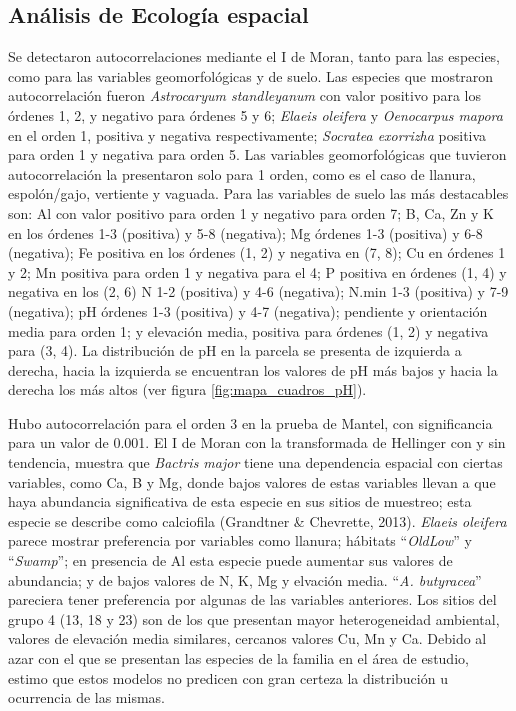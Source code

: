\documentclass[11pt,]{article}
\begin{document}
\subsection{Análisis de Ecología
espacial}\label{anuxe1lisis-de-ecologuxeda-espacial-1}

Se detectaron autocorrelaciones mediante el I de Moran, tanto para las
especies, como para las variables geomorfológicas y de suelo. Las
especies que mostraron autocorrelación fueron \emph{Astrocaryum
standleyanum} con valor positivo para los órdenes 1, 2, y negativo para
órdenes 5 y 6; \emph{Elaeis oleifera} y \emph{Oenocarpus mapora} en el
orden 1, positiva y negativa respectivamente; \emph{Socratea exorrizha}
positiva para orden 1 y negativa para orden 5. Las variables
geomorfológicas que tuvieron autocorrelación la presentaron solo para 1
orden, como es el caso de llanura, espolón/gajo, vertiente y vaguada.
Para las variables de suelo las más destacables son: Al con valor
positivo para orden 1 y negativo para orden 7; B, Ca, Zn y K en los
órdenes 1-3 (positiva) y 5-8 (negativa); Mg órdenes 1-3 (positiva) y 6-8
(negativa); Fe positiva en los órdenes (1, 2) y negativa en (7, 8); Cu
en órdenes 1 y 2; Mn positiva para orden 1 y negativa para el 4; P
positiva en órdenes (1, 4) y negativa en los (2, 6) N 1-2 (positiva) y
4-6 (negativa); N.min 1-3 (positiva) y 7-9 (negativa); pH órdenes 1-3
(positiva) y 4-7 (negativa); pendiente y orientación media para orden 1;
y elevación media, positiva para órdenes (1, 2) y negativa para (3, 4).
La distribución de pH en la parcela se presenta de izquierda a derecha,
hacia la izquierda se encuentran los valores de pH más bajos y hacia la
derecha los más altos (ver figura \ref{fig:mapa_cuadros_pH}).

Hubo autocorrelación para el orden 3 en la prueba de Mantel, con
significancia para un valor de 0.001. El I de Moran con la transformada
de Hellinger con y sin tendencia, muestra que \emph{Bactris major} tiene
una dependencia espacial con ciertas variables, como Ca, B y Mg, donde
bajos valores de estas variables llevan a que haya abundancia
significativa de esta especie en sus sitios de muestreo; esta especie se
describe como calciofila (Grandtner \& Chevrette, 2013). \emph{Elaeis
oleifera} parece mostrar preferencia por variables como llanura;
hábitats ``\emph{OldLow}'' y ``\emph{Swamp}''; en presencia de Al esta
especie puede aumentar sus valores de abundancia; y de bajos valores de
N, K, Mg y elvación media. ``\emph{A. butyracea}'' pareciera tener
preferencia por algunas de las variables anteriores. Los sitios del
grupo 4 (13, 18 y 23) son de los que presentan mayor heterogeneidad
ambiental, valores de elevación media similares, cercanos valores Cu, Mn
y Ca. Debido al azar con el que se presentan las especies de la familia
en el área de estudio, estimo que estos modelos no predicen con gran
certeza la distribución u ocurrencia de las mismas.
\end{document}

